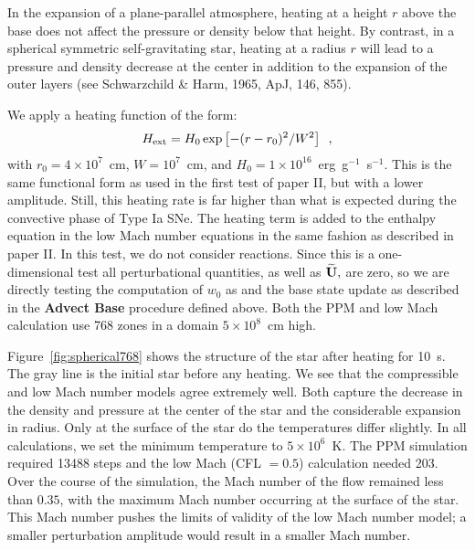 In the expansion of a plane-parallel atmosphere, heating at a
height $r$ above the base does not affect the pressure or density 
below that height.  By contrast, in a spherical symmetric
self-gravitating star, heating at a radius $r$ will lead to a pressure
and density decrease at the center in addition to the expansion of the
outer layers (see Schwarzchild \& Harm, 1965, ApJ, 146, 855).


We apply a heating function of the form:
\begin{equation}
{H_{\rm ext}} = H_0 \exp \left [-(r-r_0)^2 / W^2 \right ] \enskip ,
\end{equation}
with $r_0 = 4\times 10^7$~cm, $W = 10^7$~cm, and $H_0 = 1\times
10^{16}$~erg~g$^{-1}$~s$^{-1}$. This is the same functional form as used
in the first test of paper II, but with a lower amplitude.  Still, this
heating rate is far higher than what is expected during the convective
phase of Type Ia SNe.  The heating term is added to the enthalpy
equation in the low Mach number equations in the same fashion as
described in paper II.  In this test, we do not consider reactions.
Since this is a one-dimensional test all perturbational quantities,
as well as $\widetilde{{\bf U}},$ are zero, so we are directly testing the computation of 
$w_0$ as and the base state update as described in
the {\bf Advect Base} procedure defined above.  
Both the PPM and low Mach calculation use 768 zones in a domain $5\times
10^8$~cm high.

Figure~\ref{fig:spherical768} shows the structure of the star after
heating for 10~s.  The gray line is the initial star before any
heating.  
We see that the compressible and low Mach number models
agree extremely well.  Both capture the decrease in the density and
pressure at the center of the star and the considerable expansion in
radius.  Only at the surface of the star do the temperatures differ slightly.
In all calculations, we set the minimum temperature to $5\times
10^6$~K.  The PPM simulation required 13488 steps and the low Mach
(CFL $=0.5$) calculation needed 203.  Over the course of the
simulation, the Mach number of the flow remained less than $0.35$, with the
maximum Mach number occurring at the surface of the star.  This Mach
number pushes the limits of validity of the low Mach number model;  a
smaller perturbation amplitude would result in a smaller Mach number.


